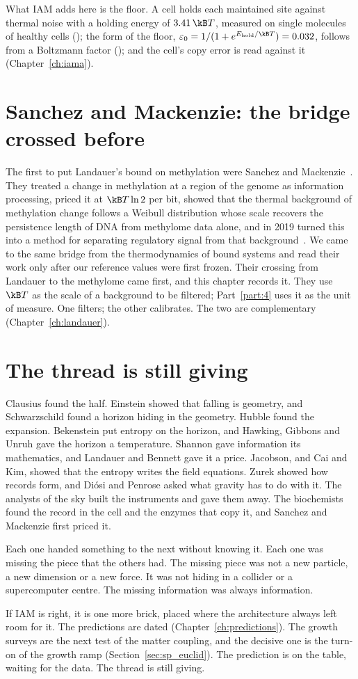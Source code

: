 What IAM adds here is the floor. A cell holds each maintained site against thermal noise with a holding energy of $3.41\,\kB T$, measured on
single molecules of healthy cells (\measured); the form of the floor, $\varepsilon_0=1/(1+e^{E_{\rm hold}/\kB T})=0.032$, follows from a
Boltzmann factor (\derived); and the cell's copy error is read against it (Chapter~\ref{ch:iama}).

\section*{Sanchez and Mackenzie: the bridge crossed before}

The first to put Landauer's bound on methylation were Sanchez and Mackenzie~\cite{Sanchez2016}. They treated a change in methylation at a
region of the genome as information processing, priced it at $\kB T\ln2$ per bit, showed that the thermal background of methylation change
follows a Weibull distribution whose scale recovers the persistence length of DNA from methylome data alone, and in 2019 turned this into a
method for separating regulatory signal from that background~\cite{Sanchez2019}. \observed{} We came to the same bridge from the
thermodynamics of bound systems and read their work only after our reference values were first frozen. Their crossing from Landauer to the
methylome came first, and this chapter records it. They use $\kB T$ as the scale of a
background to be filtered; Part~\ref{part:4} uses it as the unit of measure. One filters; the other calibrates. The two are complementary
(Chapter~\ref{ch:landauer}).

\section*{The thread is still giving}

Clausius found the half. Einstein showed that falling is geometry, and Schwarzschild found a horizon hiding in the geometry. Hubble found the
expansion. Bekenstein put entropy on the horizon, and Hawking, Gibbons and Unruh gave the horizon a temperature. Shannon gave information its
mathematics, and Landauer and Bennett gave it a price. Jacobson, and Cai and Kim, showed that the entropy writes the field equations. Zurek
showed how records form, and Di\'osi and Penrose asked what gravity has to do with it. The analysts of the sky built the instruments and gave
them away. The biochemists found the record in the cell and the enzymes that copy it, and Sanchez and Mackenzie first priced it.

Each one handed something to the next without knowing it. Each one was missing the piece that the others had. The missing piece was not a
new particle, a new dimension or a new force. It was not hiding in a collider or a supercomputer centre. The missing information was always
information.

If IAM is right, it is one more brick, placed where the architecture always left room for it. The predictions are dated
(Chapter~\ref{ch:predictions}). The growth surveys are the next test of the matter coupling, and the decisive one is the turn-on of the growth ramp
(Section~\ref{sec:sp_euclid}). \prediction{} The prediction is on the table, waiting
for the data. The thread is still giving.
